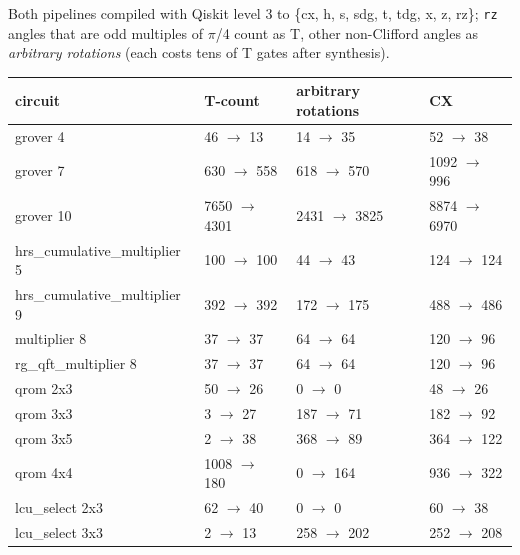 \documentclass[
  10pt,
]{article}
\newcounter{none} %
\begin{document}
Both pipelines compiled with Qiskit level 3 to \{cx, h, s, sdg, t, tdg,
x, z, rz\}; \texttt{rz} angles that are odd multiples of \ensuremath{\pi}/4 count as T,
other non-Clifford angles as \emph{arbitrary rotations} (each costs tens
of T gates after synthesis).

{\def\LTcaptype{none} %
\begin{longtable}[]{@{}llll@{}}
\toprule\noalign{}
circuit & T-count & arbitrary rotations & CX \\
\midrule\noalign{}
\endhead
\bottomrule\noalign{}
\endlastfoot
grover 4 & 46 \ensuremath{\rightarrow} 13 & 14 \ensuremath{\rightarrow} 35 & 52 \ensuremath{\rightarrow} 38 \\
grover 7 & 630 \ensuremath{\rightarrow} 558 & 618 \ensuremath{\rightarrow} 570 & 1092 \ensuremath{\rightarrow} 996 \\
grover 10 & 7650 \ensuremath{\rightarrow} 4301 & 2431 \ensuremath{\rightarrow} 3825 & 8874 \ensuremath{\rightarrow} 6970 \\
hrs\_cumulative\_multiplier 5 & 100 \ensuremath{\rightarrow} 100 & 44 \ensuremath{\rightarrow} 43 & 124 \ensuremath{\rightarrow} 124 \\
hrs\_cumulative\_multiplier 9 & 392 \ensuremath{\rightarrow} 392 & 172 \ensuremath{\rightarrow} 175 & 488 \ensuremath{\rightarrow} 486 \\
multiplier 8 & 37 \ensuremath{\rightarrow} 37 & 64 \ensuremath{\rightarrow} 64 & 120 \ensuremath{\rightarrow} 96 \\
rg\_qft\_multiplier 8 & 37 \ensuremath{\rightarrow} 37 & 64 \ensuremath{\rightarrow} 64 & 120 \ensuremath{\rightarrow} 96 \\
qrom 2x3 & 50 \ensuremath{\rightarrow} 26 & 0 \ensuremath{\rightarrow} 0 & 48 \ensuremath{\rightarrow} 26 \\
qrom 3x3 & 3 \ensuremath{\rightarrow} 27 & 187 \ensuremath{\rightarrow} 71 & 182 \ensuremath{\rightarrow} 92 \\
qrom 3x5 & 2 \ensuremath{\rightarrow} 38 & 368 \ensuremath{\rightarrow} 89 & 364 \ensuremath{\rightarrow} 122 \\
qrom 4x4 & 1008 \ensuremath{\rightarrow} 180 & 0 \ensuremath{\rightarrow} 164 & 936 \ensuremath{\rightarrow} 322 \\
lcu\_select 2x3 & 62 \ensuremath{\rightarrow} 40 & 0 \ensuremath{\rightarrow} 0 & 60 \ensuremath{\rightarrow} 38 \\
lcu\_select 3x3 & 2 \ensuremath{\rightarrow} 13 & 258 \ensuremath{\rightarrow} 202 & 252 \ensuremath{\rightarrow} 208 \\

\end{longtable}}
\end{document}
